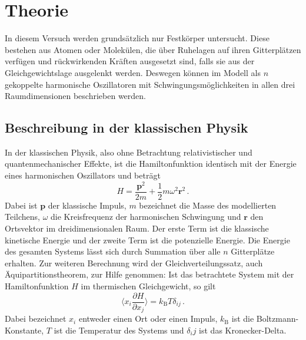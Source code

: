 \section{Theorie}
\label{sec:Theorie}
In diesem Versuch werden grundsätzlich nur Festkörper untersucht. Diese bestehen
aus Atomen oder Molekülen, die über Ruhelagen auf ihren Gitterplätzen verfügen und
rückwirkenden Kräften ausgesetzt sind, falls sie aus der Gleichgewichtslage ausgelenkt
werden. Deswegen können im Modell als $n$ gekoppelte harmonische Oszillatoren
mit Schwingungsmöglichkeiten in allen drei Raumdimensionen beschrieben werden.
\subsection{Beschreibung in der klassischen Physik}
In der klassischen Physik, also ohne Betrachtung relativistischer und quantenmechanischer
Effekte, ist die Hamiltonfunktion identisch mit der Energie eines harmonischen
Oszillators und beträgt
\begin{equation}
  H = \frac{\symbf{p}^2}{2 m} + \frac{1}{2} m \omega^2 \symbf{r}^2\,.
  \label{eqn:hamilton}
\end{equation}
Dabei ist $\symbf{p}$ der klassische Impuls, $m$ bezeichnet die Masse des modellierten
Teilchens, $\omega$ die Kreisfrequenz der harmonischen Schwingung und $\symbf{r}$
den Ortsvektor im dreidimensionalen Raum. Der erste Term ist die klassische kinetische
Energie und der zweite Term ist die potenzielle Energie. Die Energie des gesamten
Systems lässt sich durch Summation über alle $n$ Gitterplätze erhalten.\newline
Zur weiteren Berechnung wird der Gleichverteilungssatz, auch Äquipartitionstheorem, zur Hilfe genommen:
Ist das betrachtete System mit der Hamiltonfunktion $H$ im thermischen Gleichgewicht, so gilt
\begin{equation}
  \Bigg \langle x_i \frac{\partial H}{\partial x_j} \Bigg \rangle = k_\text{B} T \delta_{ij}\,.
\end{equation}
Dabei bezeichnet $x_i$ entweder einen Ort oder einen Impuls, $k_\text{B}$ ist die Boltzmann-Konstante,
$T$ ist die Temperatur des Systems und $\delta_ij$ ist das Kronecker-Delta.
